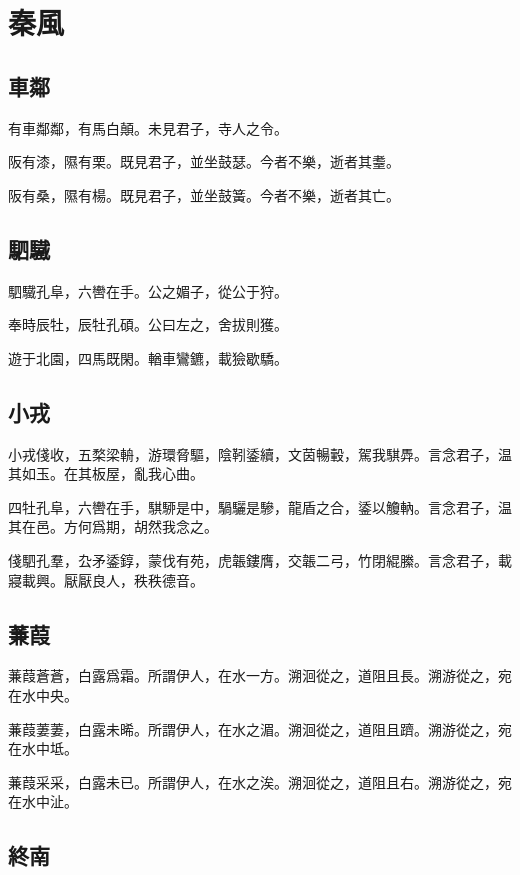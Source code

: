 \section[秦風]{秦風}

\subsection[車鄰]{車鄰}

有車鄰鄰，有馬白顛。未見君子，寺人之令。

阪有漆，隰有栗。既見君子，並坐鼓瑟。今者不樂，逝者其耋。

阪有桑，隰有楊。既見君子，並坐鼓簧。今者不樂，逝者其亡。

\subsection[駟驖]{駟驖}

駟驖孔阜，六轡在手。公之媚子，從公于狩。

奉時辰牡，辰牡孔碩。公曰左之，舍拔則獲。

遊于北園，四馬既閑。輶車鸞鑣，載獫歇驕。

\subsection[小戎]{小戎}

小戎俴收，五楘梁輈，游環脅驅，陰靷鋈續，文茵暢轂，駕我騏馵。言念君子，温其如玉。在其板屋，亂我心曲。

四牡孔阜，六轡在手，騏駵是中，騧驪是驂，龍盾之合，鋈以觼軜。言念君子，温其在邑。方何爲期，胡然我念之。

俴駟孔羣，厹矛鋈錞，蒙伐有苑，虎韔鏤膺，交韔二弓，竹閉緄縢。言念君子，載寢載興。厭厭良人，秩秩德音。

\subsection[蒹葭]{蒹葭}

蒹葭蒼蒼，白露爲霜。所謂伊人，在水一方。溯洄從之，道阻且長。溯游從之，宛在水中央。

蒹葭萋萋，白露未晞。所謂伊人，在水之湄。溯洄從之，道阻且躋。溯游從之，宛在水中坻。

蒹葭采采，白露未已。所謂伊人，在水之涘。溯洄從之，道阻且右。溯游從之，宛在水中沚。

\subsection[終南]{終南}

